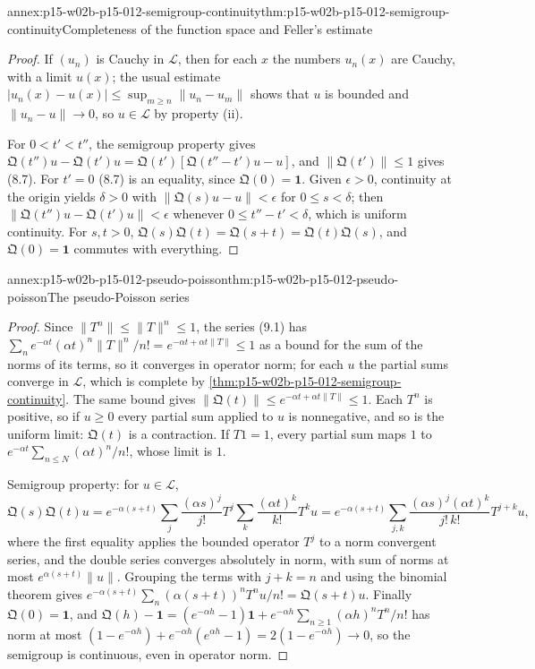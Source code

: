 \begin{annexitem}{annex:p15-w02b-p15-012-semigroup-continuity}{thm:p15-w02b-p15-012-semigroup-continuity}{Completeness of the function space and Feller's estimate}
\begin{proof}
If \((u_n)\) is Cauchy in \(\mathscr L\), then for each \(x\) the numbers
\(u_n(x)\) are Cauchy, with a limit \(u(x)\); the usual estimate
\(|u_n(x)-u(x)|\leq\sup_{m\geq n}\|u_n-u_m\|\) shows that \(u\) is bounded and
\(\|u_n-u\|\to0\), so \(u\in\mathscr L\) by property (ii).

For \(0<t'<t''\), the semigroup property gives
\(\mathfrak Q(t'')u-\mathfrak Q(t')u=\mathfrak Q(t')[\mathfrak Q(t''-t')u-u]\),
and \(\|\mathfrak Q(t')\|\leq1\) gives (8.7). For \(t'=0\) (8.7) is an equality,
since \(\mathfrak Q(0)=\mathbf 1\). Given \(\epsilon>0\), continuity at the
origin yields \(\delta>0\) with \(\|\mathfrak Q(s)u-u\|<\epsilon\) for
\(0\leq s<\delta\); then \(\|\mathfrak Q(t'')u-\mathfrak Q(t')u\|<\epsilon\)
whenever \(0\leq t''-t'<\delta\), which is uniform continuity. For \(s,t>0\),
\(\mathfrak Q(s)\mathfrak Q(t)=\mathfrak Q(s+t)=\mathfrak Q(t)\mathfrak Q(s)\),
and \(\mathfrak Q(0)=\mathbf 1\) commutes with everything.
\end{proof}
\end{annexitem}

\begin{annexitem}{annex:p15-w02b-p15-012-pseudo-poisson}{thm:p15-w02b-p15-012-pseudo-poisson}{The pseudo-Poisson series}
\begin{proof}
Since \(\|T^n\|\leq\|T\|^n\leq1\), the series (9.1) has
\(\sum_n e^{-\alpha t}(\alpha t)^n\|T\|^n/n!=e^{-\alpha t+\alpha t\|T\|}\leq1\)
as a bound for the sum of the norms of its terms, so it converges in operator
norm; for each \(u\) the partial sums converge in \(\mathscr L\), which is
complete by \cref{thm:p15-w02b-p15-012-semigroup-continuity}. The same bound
gives \(\|\mathfrak Q(t)\|\leq e^{-\alpha t+\alpha t\|T\|}\leq1\). Each \(T^n\)
is positive, so if \(u\geq0\) every partial sum applied to \(u\) is
nonnegative, and so is the uniform limit: \(\mathfrak Q(t)\) is a contraction.
If \(T1=1\), every partial sum maps \(1\) to
\(e^{-\alpha t}\sum_{n\leq N}(\alpha t)^n/n!\), whose limit is \(1\).

Semigroup property: for \(u\in\mathscr L\),
\[
 \mathfrak Q(s)\mathfrak Q(t)u
  =e^{-\alpha(s+t)}\sum_{j}\frac{(\alpha s)^j}{j!}T^j\sum_k\frac{(\alpha t)^k}{k!}T^ku
  =e^{-\alpha(s+t)}\sum_{j,k}\frac{(\alpha s)^j(\alpha t)^k}{j!\,k!}T^{j+k}u,
\]
where the first equality applies the bounded operator \(T^j\) to a norm
convergent series, and the double series converges absolutely in norm, with
sum of norms at most \(e^{\alpha(s+t)}\|u\|\). Grouping the terms with
\(j+k=n\) and using the binomial theorem gives
\(e^{-\alpha(s+t)}\sum_n(\alpha(s+t))^nT^nu/n!=\mathfrak Q(s+t)u\). Finally
\(\mathfrak Q(0)=\mathbf 1\), and
\(\mathfrak Q(h)-\mathbf 1=(e^{-\alpha h}-1)\mathbf 1+e^{-\alpha h}\sum_{n\geq1}(\alpha h)^nT^n/n!\)
has norm at most \((1-e^{-\alpha h})+e^{-\alpha h}(e^{\alpha h}-1)=2(1-e^{-\alpha h})\to0\),
so the semigroup is continuous, even in operator norm.
\end{proof}
\end{annexitem}

